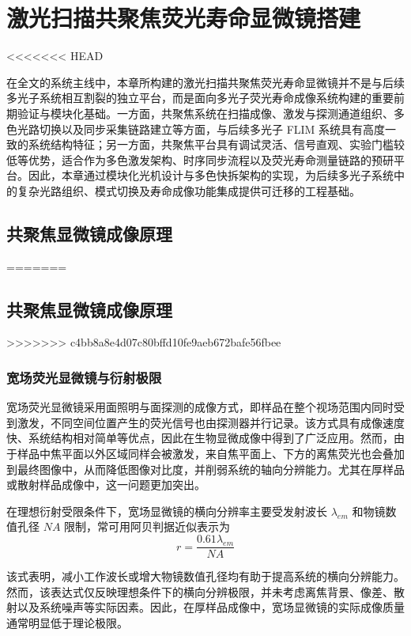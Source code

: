 \chapter{激光扫描共聚焦荧光寿命显微镜搭建}\label{Chap:3}
<<<<<<< HEAD

在全文的系统主线中，本章所构建的激光扫描共聚焦荧光寿命显微镜并不是与后续多光子系统相互割裂的独立平台，而是面向多光子荧光寿命成像系统构建的重要前期验证与模块化基础。一方面，共聚焦系统在扫描成像、激发与探测通道组织、多色光路切换以及同步采集链路建立等方面，与后续多光子 FLIM 系统具有高度一致的系统结构特征；另一方面，共聚焦平台具有调试灵活、信号直观、实验门槛较低等优势，适合作为多色激发架构、时序同步流程以及荧光寿命测量链路的预研平台。因此，本章通过模块化光机设计与多色快拆架构的实现，为后续多光子系统中的复杂光路组织、模式切换及寿命成像功能集成提供可迁移的工程基础。

\section{共聚焦显微镜成像原理}\label{3.1}
=======
\section{共聚焦显微镜成像原理}\label{3.1}

>>>>>>> c4bb8a8e4d07c80bffd10fe9aeb672bafe56fbee
\subsection{宽场荧光显微镜与衍射极限}\label{3.1.1}
宽场荧光显微镜采用面照明与面探测的成像方式，即样品在整个视场范围内同时受到激发，不同空间位置产生的荧光信号也由探测器并行记录。该方式具有成像速度快、系统结构相对简单等优点，因此在生物显微成像中得到了广泛应用。然而，由于样品中焦平面以外区域同样会被激发，来自焦平面上、下方的离焦荧光也会叠加到最终图像中，从而降低图像对比度，并削弱系统的轴向分辨能力。尤其在厚样品或散射样品成像中，这一问题更加突出。

在理想衍射受限条件下，宽场显微镜的横向分辨率主要受发射波长 $\lambda_{em}$ 和物镜数值孔径 $NA$ 限制，常可用阿贝判据近似表示为
\begin{equation}
    r=\frac{0.61\lambda_{em}}{NA}
\end{equation}

该式表明，减小工作波长或增大物镜数值孔径均有助于提高系统的横向分辨能力。然而，该表达式仅反映理想条件下的横向分辨极限，并未考虑离焦背景、像差、散射以及系统噪声等实际因素。因此，在厚样品成像中，宽场显微镜的实际成像质量通常明显低于理论极限。

